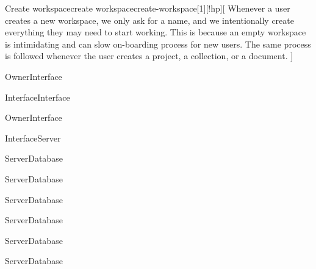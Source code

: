 \begin{sdfig}{Create workspace}{create workspace}{create-workspace}[1][!hp][
    Whenever a user creates a new workspace, we only ask for a name, and we intentionally create everything they may need to start working.
    This is because an empty workspace is intimidating and can slow on-boarding process for new users.
    The same process is followed whenever the user creates a project, a collection, or a document.
  ]

  \begin{seqdigauth}[Owner]
    \begin{umlcall}[op={Create workspace}]{Owner}{Interface}
      \begin{umlcall}[op={Redirect to workspace creation}]{Interface}{Interface}
      \end{umlcall}
    \end{umlcall}
    \begin{umlcall}[op={Submit name}]{Owner}{Interface}
      \begin{umlcall}[op={Create workspace},return=Ok]{Interface}{Server}
        \begin{umlcall}[op={Create project}]{Server}{Database}
        \end{umlcall}
        \begin{umlcall}[op={Create collection}]{Server}{Database}
        \end{umlcall}
        \begin{umlcall}[op={Create field}]{Server}{Database}
        \end{umlcall}
        \begin{umlcall}[op={Create view}]{Server}{Database}
        \end{umlcall}
        \begin{umlcall}[op={Create document}]{Server}{Database}
        \end{umlcall}
        \begin{umlcall}[op={Create block}]{Server}{Database}
        \end{umlcall}
      \end{umlcall}
    \end{umlcall}
  \end{seqdigauth}
\end{sdfig}


